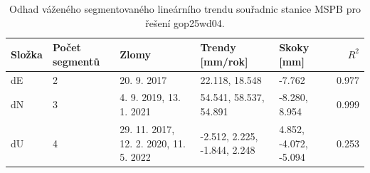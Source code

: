 \begin{table}[htbp]
\caption{Odhad váženého segmentovaného lineárního trendu souřadnic stanice MSPB pro řešení gop25wd04.}
\label{tab:gop25wd04_stcd_mspb_weighted_multiseg}
\begin{tabular}{lllllr}
\toprule
Složka & Počet segmentů & Zlomy & Trendy [mm/rok] & Skoky [mm] & $R^2$ \\
\midrule
dE & 2 & 20. 9. 2017 & 22.118, 18.548 & -7.762 & 0.977 \\
dN & 3 & 4. 9. 2019, 13. 1. 2021 & 54.541, 58.537, 54.891 & -8.280, 8.954 & 0.999 \\
dU & 4 & 29. 11. 2017, 12. 2. 2020, 11. 5. 2022 & -2.512, 2.225, -1.844, 2.248 & 4.852, -4.072, -5.094 & 0.253 \\
\bottomrule
\end{tabular}
\end{table}
